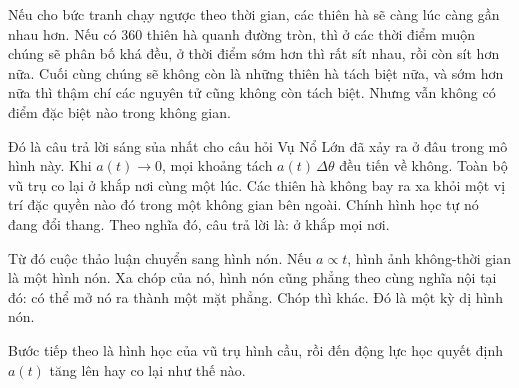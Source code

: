 Nếu cho bức tranh chạy ngược theo thời gian, các thiên hà sẽ càng lúc càng gần nhau hơn. Nếu có \(360\) thiên hà quanh đường tròn, thì ở các thời điểm muộn chúng sẽ phân bố khá đều, ở thời điểm sớm hơn thì rất sít nhau, rồi còn sít hơn nữa. Cuối cùng chúng sẽ không còn là những thiên hà tách biệt nữa, và sớm hơn nữa thì thậm chí các nguyên tử cũng không còn tách biệt. Nhưng vẫn không có điểm đặc biệt nào trong không gian.

Đó là câu trả lời sáng sủa nhất cho câu hỏi Vụ Nổ Lớn đã xảy ra ở đâu trong mô hình này. Khi \(a(t)\to 0\), mọi khoảng tách \(a(t)\,\Delta\theta\) đều tiến về không. Toàn bộ vũ trụ co lại ở khắp nơi cùng một lúc. Các thiên hà không bay ra xa khỏi một vị trí đặc quyền nào đó trong một không gian bên ngoài. Chính hình học tự nó đang đổi thang. Theo nghĩa đó, câu trả lời là: ở khắp mọi nơi.

\begin{classroomqa}
\end{classroomqa}

Từ đó cuộc thảo luận chuyển sang hình nón. Nếu \(a\propto t\), hình ảnh không-thời gian là một hình nón. Xa chóp của nó, hình nón cũng phẳng theo cùng nghĩa nội tại đó: có thể mở nó ra thành một mặt phẳng. Chóp thì khác. Đó là một kỳ dị hình nón.

Bước tiếp theo là hình học của vũ trụ hình cầu, rồi đến động lực học quyết định \(a(t)\) tăng lên hay co lại như thế nào.
